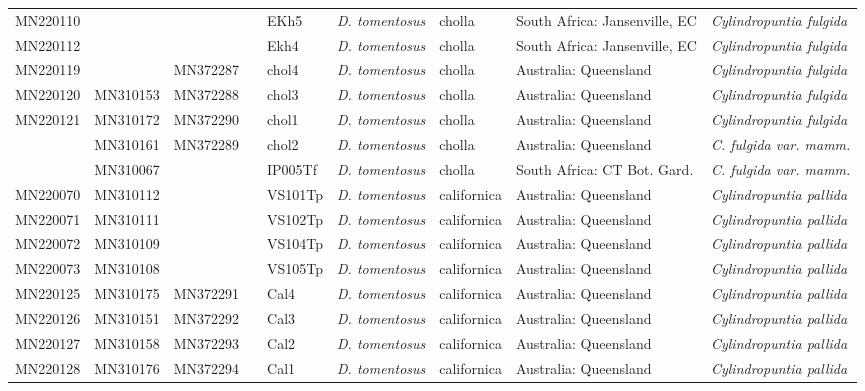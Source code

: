 \begin{landscape}
{\begin{longtable}{@{}lllllp{2.7cm}p{2.2cm}p{5cm}p{4cm}@{}}
MN220110 &  &  &  & EKh5 & \textit{D. tomentosus} & cholla & South Africa: Jansenville, EC & \textit{Cylindropuntia fulgida} \\
MN220112 &  &  &  & Ekh4 & \textit{D. tomentosus} & cholla & South Africa: Jansenville, EC & \textit{Cylindropuntia fulgida} \\
MN220119 &  & MN372287 &  & chol4 & \textit{D. tomentosus} & cholla & Australia: Queensland & \textit{Cylindropuntia fulgida} \\
MN220120 & MN310153 & MN372288 &  & chol3 & \textit{D. tomentosus} & cholla & Australia: Queensland & \textit{Cylindropuntia fulgida} \\
MN220121 & MN310172 & MN372290 &  & chol1 & \textit{D. tomentosus} & cholla & Australia: Queensland & \textit{Cylindropuntia fulgida} \\
 & MN310161 & MN372289 &  & chol2 & \textit{D. tomentosus} & cholla & Australia: Queensland & \textit{C. fulgida var. mamm.} \\
 & MN310067 &  &  & IP005Tf & \textit{D. tomentosus} & cholla & South Africa: CT Bot. Gard. & \textit{C. fulgida var. mamm.} \\
MN220070 & MN310112 &  &  & VS101Tp & \textit{D. tomentosus} & californica & Australia: Queensland & \textit{Cylindropuntia pallida} \\
MN220071 & MN310111 &  &  & VS102Tp & \textit{D. tomentosus} & californica & Australia: Queensland & \textit{Cylindropuntia pallida} \\
MN220072 & MN310109 &  &  & VS104Tp & \textit{D. tomentosus} & californica & Australia: Queensland & \textit{Cylindropuntia pallida} \\
MN220073 & MN310108 &  &  & VS105Tp & \textit{D. tomentosus} & californica & Australia: Queensland & \textit{Cylindropuntia pallida} \\
MN220125 & MN310175 & MN372291 &  & Cal4 & \textit{D. tomentosus} & californica & Australia: Queensland & \textit{Cylindropuntia pallida} \\
MN220126 & MN310151 & MN372292 &  & Cal3 & \textit{D. tomentosus} & californica & Australia: Queensland & \textit{Cylindropuntia pallida} \\
MN220127 & MN310158 & MN372293 &  & Cal2 & \textit{D. tomentosus} & californica & Australia: Queensland & \textit{Cylindropuntia pallida} \\
MN220128 & MN310176 & MN372294 &  & Cal1 & \textit{D. tomentosus} & californica & Australia: Queensland & \textit{Cylindropuntia pallida} \\

\end{longtable}}
\end{landscape}
